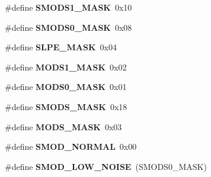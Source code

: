 \begin{DoxyCompactItemize}
\item 
\hypertarget{group___engduino_accelerometer_gabd2f0eeeae8af8ead2b5e7cc1bcaacb3}{}\#define {\bfseries S\+M\+O\+D\+S1\+\_\+\+M\+A\+S\+K}~0x10\label{group___engduino_accelerometer_gabd2f0eeeae8af8ead2b5e7cc1bcaacb3}

\item 
\hypertarget{group___engduino_accelerometer_ga69e599771e47214420f82c6ca09ab1be}{}\#define {\bfseries S\+M\+O\+D\+S0\+\_\+\+M\+A\+S\+K}~0x08\label{group___engduino_accelerometer_ga69e599771e47214420f82c6ca09ab1be}

\item 
\hypertarget{group___engduino_accelerometer_gaa2218594e74292ec34dbe89e35eb75ab}{}\#define {\bfseries S\+L\+P\+E\+\_\+\+M\+A\+S\+K}~0x04\label{group___engduino_accelerometer_gaa2218594e74292ec34dbe89e35eb75ab}

\item 
\hypertarget{group___engduino_accelerometer_ga7c84ea2b1b925780f73853943dda0ebf}{}\#define {\bfseries M\+O\+D\+S1\+\_\+\+M\+A\+S\+K}~0x02\label{group___engduino_accelerometer_ga7c84ea2b1b925780f73853943dda0ebf}

\item 
\hypertarget{group___engduino_accelerometer_gac65bbd77144086e84f3bcf5684c12f35}{}\#define {\bfseries M\+O\+D\+S0\+\_\+\+M\+A\+S\+K}~0x01\label{group___engduino_accelerometer_gac65bbd77144086e84f3bcf5684c12f35}

\item 
\hypertarget{group___engduino_accelerometer_ga95a2bb2572831ca027f40ea6d30e2f01}{}\#define {\bfseries S\+M\+O\+D\+S\+\_\+\+M\+A\+S\+K}~0x18\label{group___engduino_accelerometer_ga95a2bb2572831ca027f40ea6d30e2f01}

\item 
\hypertarget{group___engduino_accelerometer_ga9476833a84e993449b8a56e2fe218637}{}\#define {\bfseries M\+O\+D\+S\+\_\+\+M\+A\+S\+K}~0x03\label{group___engduino_accelerometer_ga9476833a84e993449b8a56e2fe218637}

\item 
\hypertarget{group___engduino_accelerometer_gaf345dde9b126decb8948e7b138b42f69}{}\#define {\bfseries S\+M\+O\+D\+\_\+\+N\+O\+R\+M\+A\+L}~0x00\label{group___engduino_accelerometer_gaf345dde9b126decb8948e7b138b42f69}

\item 
\hypertarget{group___engduino_accelerometer_ga4a51e07c9506995cdd56561ac4060f9f}{}\#define {\bfseries S\+M\+O\+D\+\_\+\+L\+O\+W\+\_\+\+N\+O\+I\+S\+E}~(S\+M\+O\+D\+S0\+\_\+\+M\+A\+S\+K)\label{group___engduino_accelerometer_ga4a51e07c9506995cdd56561ac4060f9f}


\end{DoxyCompactItemize}
